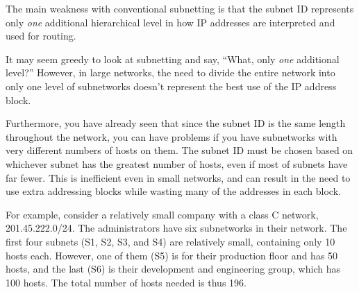 


The main weakness with conventional subnetting is that the subnet ID represents
only {\emph{one}} additional hierarchical level in how IP addresses are
interpreted and used for routing.

It may seem greedy to look at subnetting and say, ``What, only
{\emph{one}} additional level?'' However, in large networks, the need to
divide the entire network into only one level of subnetworks doesn't
represent the best use of the IP address block.

Furthermore, you have already seen that since the subnet ID is the same
length throughout the network, you can have problems if you have
subnetworks with very different numbers of hosts on them. The subnet ID
must be chosen based on whichever subnet has the greatest number of
hosts, even if most of subnets have far fewer. This is inefficient even
in small networks, and can result in the need to use extra addressing
blocks while wasting many of the addresses in each block.

For example, consider a relatively small company with a class C network,
201.45.222.0/24. The administrators have six subnetworks in their
network. The first four subnets (S1, S2, S3, and S4) are relatively
small, containing only 10 hosts each. However, one of them (S5) is for
their production floor and has 50 hosts, and the last (S6) is their
development and engineering group, which has 100 hosts. The total number
of hosts needed is thus 196.

